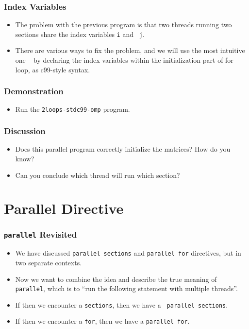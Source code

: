 \documentclass{beamer}
\begin{document}
\begin{frame}
  \frametitle{Index Variables}
  \begin{itemize}
  \item The problem with the previous program is that two threads
    running two sections share the index variables {\tt i} and {\tt
      j}.
  \item There are various ways to fix the problem, and we will use
    the most intuitive one -- by declaring the index variables
    within the initialization part of for loop, as c99-style syntax.
  \end{itemize}
\end{frame}


\begin{frame}
  \frametitle{Demonstration}
  \begin{itemize}
  \item Run the {\tt 2loops-stdc99-omp} program.
  \end{itemize}
\end{frame}

\begin{frame}
  \frametitle{Discussion}
  \begin{itemize}
  \item Does this parallel program correctly initialize the matrices?
    How do you know?
  \item Can you conclude which thread will run which section?
  \end{itemize}
\end{frame}

\section{Parallel Directive}

\begin{frame}
  \frametitle{{\tt parallel} Revisited}
  \begin{itemize}
  \item We have discussed {\tt parallel sections} and {\tt parallel for}
    directives, but in two separate contexts.
  \item Now we want to combine the idea and describe the true meaning of
    {\tt parallel}, which is to ``run the following statement with
    multiple threads''.
  \item If then we encounter a {\tt sections}, then we have a {\tt
    parallel sections}.
  \item If then we encounter a {\tt for}, then we have a {\tt parallel
    for}.
  \end{itemize}
\end{frame}
\end{document}
